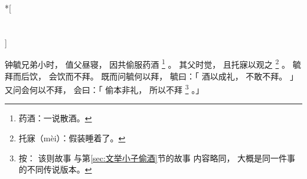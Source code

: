 
\switchcolumn[0]*[\section{}]

钟毓兄弟小时，
值父昼寝，
因共偷服药酒%
\footnote{%
    药酒：一说散酒。
}%
。
其父时觉，
且托寐以观之%
\footnote{%
    托寐（mèi）：假装睡着了。
}%
。
毓拜而后饮，
会饮而不拜。
既而问毓何以拜，
毓曰：「
    酒以成礼，
    不敢不拜。
」
又问会何以不拜，
会曰：「
    偷本非礼，
    所以不拜%
    \footnote{%
        按：
        该则故事
        与第\ref{sec:文举小子偷酒}节的故事
        内容略同，
        大概是同一件事的不同传说版本。
    }%
。」

\switchcolumn


